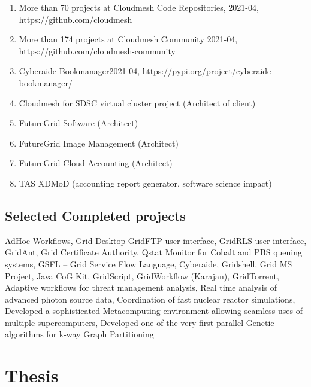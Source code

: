 \documentclass{article}
\begin{document}
\begin{enumerate}
\item  More than 70 projects at Cloudmesh Code Repositories, 2021-04, https://github.com/cloudmesh
\item  More than 174 projects at Cloudmesh Community 2021-04, https://github.com/cloudmesh-community
\item  Cyberaide Bookmanager2021-04, https://pypi.org/project/cyberaide-bookmanager/
\item  Cloudmesh for SDSC virtual cluster project (Architect of client)
\item  FutureGrid Software (Architect)
\item  FutureGrid Image Management (Architect)
\item  FutureGrid Cloud Accounting (Architect)
\item  TAS  XDMoD (accounting report generator,  software science impact)
\end{enumerate}

\subsection{Selected Completed projects} 

AdHoc Workflows, Grid Desktop   GridFTP user interface, GridRLS user interface, GridAnt, Grid Certificate Authority, Qstat Monitor for Cobalt and PBS queuing systems, GSFL – Grid Service Flow Language, Cyberaide, Gridshell, Grid MS Project, Java CoG Kit, GridScript, GridWorkflow (Karajan), GridTorrent, Adaptive workflows for threat management analysis, Real time analysis of advanced photon source data, Coordination of fast nuclear reactor simulations, Developed a sophisticated Metacomputing environment allowing seamless uses of multiple supercomputers, Developed one of the very first parallel Genetic algorithms for k-way Graph Partitioning 




\section{Thesis}

\begin{refsection}

\nocite{las-96-thesis}
\printbibliography[heading=none]

\end{refsection}
\end{document}
